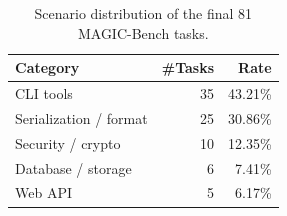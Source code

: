 \begin{table}[t]
\centering
\caption{Scenario distribution of the final 81 MAGIC-Bench tasks.}
\label{tab:tab_dataset_scenarios}
\begin{tabular}{lrr}
\toprule
Category & \#Tasks & Rate \\
\midrule
CLI tools & 35 & 43.21\% \\
Serialization / format & 25 & 30.86\% \\
Security / crypto & 10 & 12.35\% \\
Database / storage & 6 & 7.41\% \\
Web API & 5 & 6.17\% \\
\bottomrule
\end{tabular}
\end{table}
